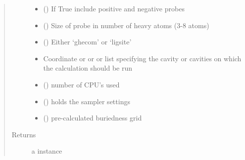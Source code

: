 \documentclass[letterpaper,10pt,english]{sphinxmanual}
\begin{document}
\begin{fulllineitems}
\begin{fulllineitems}
\begin{quote}
\begin{description}
\begin{itemize}
\item {} 
 () \textendash{} If True include positive and negative probes

\item {} 
 () \textendash{} Size of probe in number of heavy atoms (3-8 atoms)

\item {} 
 () \textendash{} Either ‘ghecom’ or ‘ligsite’

\item {} 
 \textendash{} Coordinate or  or  or list specifying the cavity or cavities on which the calculation should be run

\item {} 
 () \textendash{} number of CPU’s used

\item {} 
 ({\hyperref[\detokenize{calculation_api:hotspots.calculation.Runner.Settings}]{}}) \textendash{} holds the sampler settings

\item {} 
 () \textendash{} pre-calculated buriedness grid

\end{itemize}

\item[{Returns}] \leavevmode
a {\hyperref[\detokenize{result_api:hotspots.result.Results}]{}} instance

\end{description}\end{quote}

\begin{sphinxVerbatim}[commandchars=\\\{\}]
   
   
\end{sphinxVerbatim}


\end{fulllineitems}
\end{fulllineitems}
\end{document}
